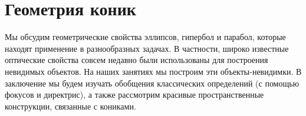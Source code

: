 
\section*{Геометрия коник}



Мы обсудим геометрические свойства эллипсов, гипербол и парабол, которые
находят применение в разнообразных задачах.
В частности, широко известные оптические свойства совсем недавно были
использованы для построения невидимых объектов.
На наших занятиях мы построим эти объекты-невидимки.
В заключение мы будем изучать обобщения классических определений (с помощью
фокусов и директрис), а также рассмотрим красивые пространственные конструкции,
связанные с кониками.

